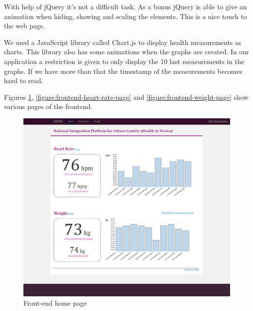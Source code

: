 With help of jQuery it's not a difficult task.
As a bonus jQuery is able to give an animation when hiding, showing and scaling the elements.
This is a nice touch to the web page.

We used a JavaScript library called Chart.js to display health measurements as charts. 
This library also has some animations when the graphs are created.
In our application a restriction is given to only display the 10 last measurements in the graphs.
If we have more than that the timestamp of the measurements becomes hard to read.

Figures \ref{figure:frontend-main-page}, \ref{figure:frontend-heart-rate-page} and \ref{figure:frontend-weight-page}
show various pages of the frontend.


\begin{figure}[H]
\centering
\includegraphics[scale=0.4]{../Figures/frontend-main-page.png}
\caption{Front-end home page}
\label{figure:frontend-main-page}
\end{figure}


